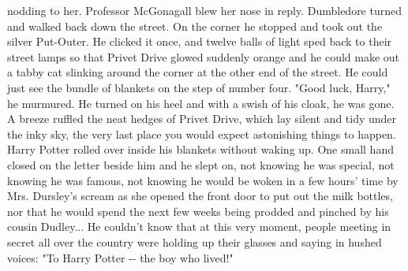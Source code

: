 \documentclass{article}%
\begin{document}
\newline%
nodding to her. Professor McGonagall blew her nose in reply.
\newline%
Dumbledore turned and walked back down the street. On the corner he
\newline%
stopped and took out the silver Put{-}Outer. He clicked it once, and
\newline%
twelve balls of light sped back to their street lamps so that Privet
\newline%
Drive glowed suddenly orange and he could make out a tabby cat slinking
\newline%
around the corner at the other end of the street. He could just see the
\newline%
bundle of blankets on the step of number four.
\newline%
"Good luck, Harry," he murmured. He turned on his heel and with a swish
\newline%
of his cloak, he was gone.
\newline%
A breeze ruffled the neat hedges of Privet Drive, which lay silent and
\newline%
tidy under the inky sky, the very last place you would expect
\newline%
astonishing things to happen. Harry Potter rolled over inside his
\newline%
blankets without waking up. One small hand closed on the letter beside
\newline%
him and he slept on, not knowing he was special, not knowing he was
\newline%
famous, not knowing he would be woken in a few hours' time by Mrs.
\newline%
Dursley's scream as she opened the front door to put out the milk
\newline%
bottles, nor that he would spend the next few weeks being prodded and
\newline%
pinched by his cousin Dudley... He couldn't know that at this very
\newline%
moment, people meeting in secret all over the country were holding up
\newline%
their glasses and saying in hushed voices: "To Harry Potter {-}{-} the boy
\newline%
who lived!"%
\end{document}
